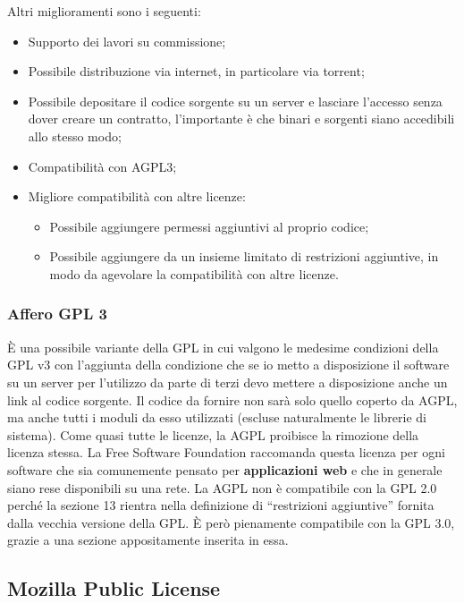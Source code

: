 Altri miglioramenti sono i seguenti:

\begin{itemize}

\item Supporto dei lavori su commissione;
\item Possibile distribuzione via internet, in particolare via torrent;
\item Possibile depositare il codice sorgente su un server e lasciare l'accesso senza dover creare un contratto, l'importante è che binari e sorgenti siano accedibili allo stesso modo;
\item Compatibilità con AGPL3;
\item Migliore compatibilità con altre licenze:

  \begin{itemize}
  \item Possibile aggiungere permessi aggiuntivi al proprio codice;
  \item Possibile aggiungere da un insieme limitato di restrizioni aggiuntive, in modo da agevolare la compatibilità con altre licenze.
  \end{itemize}

\end{itemize}

\subsubsection{Affero GPL 3}

È una possibile variante della GPL in cui valgono le medesime condizioni della GPL v3 con l'aggiunta della condizione che se io metto a disposizione il software su un server per l'utilizzo da parte di terzi devo mettere a disposizione anche un link al codice sorgente. Il codice da fornire non sarà solo quello coperto da AGPL, ma anche tutti i moduli da esso utilizzati (escluse naturalmente le librerie di sistema). Come quasi tutte le licenze, la AGPL proibisce la rimozione della licenza stessa. La Free Software Foundation raccomanda questa licenza per ogni software che sia comunemente pensato per \textbf{applicazioni web} e che in generale siano rese disponibili su una rete. La AGPL non è compatibile con la GPL 2.0 perché la sezione 13 rientra nella definizione di ``restrizioni aggiuntive'' fornita dalla vecchia versione della GPL. È però pienamente compatibile con la GPL 3.0, grazie a una sezione appositamente inserita in essa.

\subsection{Mozilla Public License}

